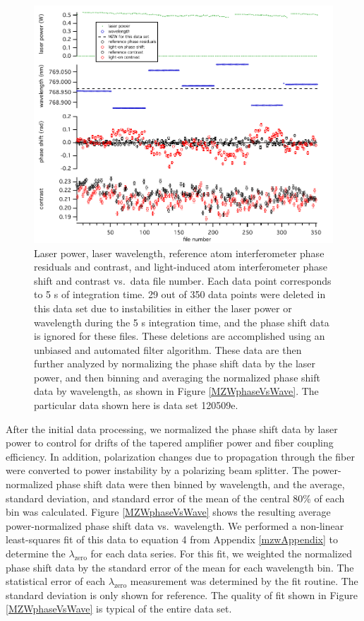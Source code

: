 \begin{figure}
\centerline{\includegraphics[width=.90\textwidth]{Figures/120509eRefOnPhaseWavePowerCon.pdf}}
\caption[Light-induced phase shift and contrast, and laser power and wavelength vs.~data file number]{\label{MZWRefOnPhase}Laser power, laser wavelength, reference atom interferometer phase residuals and contrast, and light-induced atom interferometer phase shift and contrast vs.~data file number. Each data point corresponds to 5 s of integration time. 29 out of 350 data points were deleted in this data set due to instabilities in either the laser power or wavelength during the 5 s integration time, and the phase shift data is ignored for these files. These deletions are accomplished using an unbiased and automated filter algorithm. These data are then further analyzed by normalizing the phase shift data by the laser power, and then binning and averaging the normalized phase shift data by wavelength, as shown in Figure \ref{MZWphaseVsWave}. The particular data shown here is data set 120509e.}
\end{figure}


After the initial data processing, we normalized the phase shift data by laser power to control for drifts of the tapered amplifier power and fiber coupling efficiency. In addition, polarization changes due to propagation through the fiber were converted to power instability by a polarizing beam splitter. The power-normalized phase shift data were then binned by wavelength, and the average, standard deviation, and standard error of the mean of the central 80\% of each bin was calculated. Figure \ref{MZWphaseVsWave} shows the resulting average power-normalized phase shift data vs.~wavelength. We performed a non-linear least-squares fit of this data to equation 4 from Appendix \ref{mzwAppendix} to determine the $\lambda_\textrm{zero}$ for each data series. For this fit, we weighted the normalized phase shift data by the standard error of the mean for each wavelength bin. The statistical error of each $\lambda_\textrm{zero}$ measurement was determined by the fit routine. The standard deviation is only shown for reference. The quality of fit shown in Figure \ref{MZWphaseVsWave} is typical of the entire data set. 


